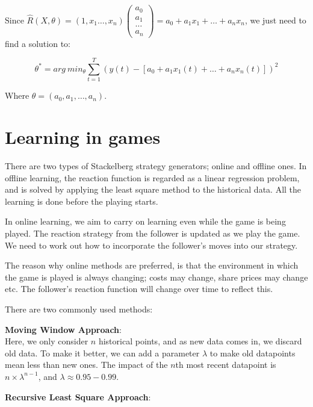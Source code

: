 Since $\hat{R}(X, \theta) = (1, x_1 \dots, x_n) \left( \begin{smallmatrix}
a_0\\ a_1\\ \dots \\ a_n \end{smallmatrix} \right) = a_0 + a_1x_1 + \dots +
a_nx_n$, we just need to find a solution to:

\[
  \theta^* = arg~min_\theta \sum^T_{t=1}(y(t) - [a_0 + a_1x_1(t) + \dots +
a_nx_n(t)])^2
\]

Where $\theta = (a_0, a_1, \dots, a_n)$.



\section{Learning in games}

There are two types of Stackelberg strategy generators; online and offline ones.
In offline learning, the reaction function is regarded as a linear regression
problem, and is solved by applying the least square method to the historical
data. All the learning is done before the playing starts.

In online learning, we aim to carry on learning even while the game is being
played. The reaction strategy from the follower is updated as we play the game.
We need to work out how to incorporate the follower's moves into our strategy.

The reason why online methods are preferred, is that the environment in which
the game is played is always changing; costs may change, share prices may change
etc. The follower's reaction function will change over time to reflect this.

There are two commonly used methods:

\begin{description}
  \item \textbf{Moving Window Approach}:\\
    Here, we only consider $n$ historical points, and as new data comes in, we
    discard old data.
    To make it better, we can add a parameter $\lambda$ to make old datapoints
    mean less than new ones. The impact of the $n$th most recent datapoint is
    $n \times \lambda ^{n-1}$, and $\lambda \approx 0.95-0.99$.
  \item \textbf{Recursive Least Square Approach}:\\
    
\end{description}


